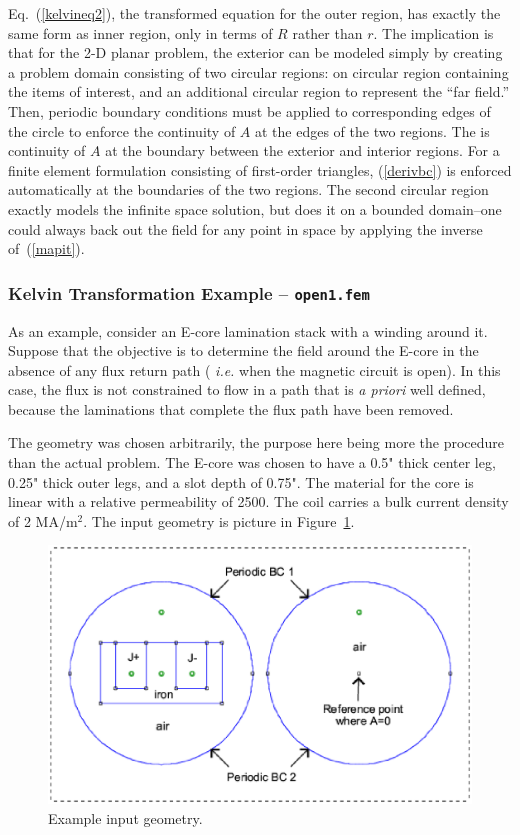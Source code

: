 \documentclass[12pt]{report}
\begin{document}
Eq.~(\ref{kelvineq2}), the transformed equation for the outer region, has
exactly the same form as inner region, only in terms of $R$ rather
than $r$.  The implication is that for the 2-D planar problem, the
exterior can be modeled simply by creating a problem domain
consisting of two circular regions:  on circular region containing
the items of interest, and an additional circular region to
represent the ``far field.'' Then, periodic boundary conditions
must be applied to corresponding edges of the circle to enforce the
continuity of $A$ at the edges of the two regions.  The is
continuity of $A$ at the boundary between the exterior and interior
regions.  For a finite element formulation consisting of
first-order triangles, (\ref{derivbc}) is enforced automatically at
the boundaries of the two regions.  The second circular region
exactly models the infinite space solution, but does it on a
bounded domain--one could always back out the field for any point
in space by applying the inverse of~(\ref{mapit}).

\subsubsection{Kelvin Transformation Example -- {\tt open1.fem}}

As an example, consider an E-core lamination stack with a winding
around it.  Suppose that the objective is to determine the field
around the E-core in the absence of any flux return path ({\em
i.e.} when the magnetic circuit is open).  In this case, the flux
is not constrained to flow in a path that is {\em a priori} well
defined, because the laminations that complete the flux path have
been removed.

The geometry was chosen arbitrarily, the purpose here being more
the procedure than the actual problem.  The E-core was chosen to
have a 0.5" thick center leg, 0.25" thick outer legs, and a slot
depth of 0.75".  The material for the core is linear with a
relative permeability of 2500.  The coil carries a bulk current
density of 2 MA/m$^2$.  The input geometry is picture in
Figure~\ref{ex1prob}.
\begin{figure}
\centerline{\includegraphics[width=6in]{open1.ps}}
\caption{Example input geometry.}
\label{ex1prob}
\end{figure}
\end{document}
